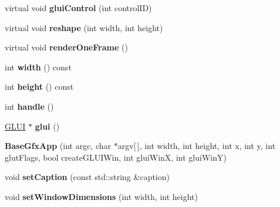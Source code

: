 \begin{DoxyCompactItemize}
\item 
\hypertarget{classBaseGfxApp_a2978a7c358794c67df73b66776b2cef3}{virtual void {\bfseries glui\-Control} (int control\-I\-D)}\label{classBaseGfxApp_a2978a7c358794c67df73b66776b2cef3}

\item 
\hypertarget{classBaseGfxApp_a5d8d5d778a8aecd7f5f8e9c87f4c3d20}{virtual void {\bfseries reshape} (int width, int height)}\label{classBaseGfxApp_a5d8d5d778a8aecd7f5f8e9c87f4c3d20}

\item 
\hypertarget{classBaseGfxApp_ad667534069c50951121968a2027b58e2}{virtual void {\bfseries render\-One\-Frame} ()}\label{classBaseGfxApp_ad667534069c50951121968a2027b58e2}

\item 
\hypertarget{classBaseGfxApp_ace089a1a94fb6bb0bc17e1b7fa48e05d}{int {\bfseries width} () const }\label{classBaseGfxApp_ace089a1a94fb6bb0bc17e1b7fa48e05d}

\item 
\hypertarget{classBaseGfxApp_aa253dbe16a20c40e0a1bf8ff942ceea3}{int {\bfseries height} () const }\label{classBaseGfxApp_aa253dbe16a20c40e0a1bf8ff942ceea3}

\item 
\hypertarget{classBaseGfxApp_ae9779f948eff6f45beec08091e98a803}{int {\bfseries handle} ()}\label{classBaseGfxApp_ae9779f948eff6f45beec08091e98a803}

\item 
\hypertarget{classBaseGfxApp_ac721a0fedce80308c5c0e5695016e95d}{\hyperlink{classGLUI}{G\-L\-U\-I} $\ast$ {\bfseries glui} ()}\label{classBaseGfxApp_ac721a0fedce80308c5c0e5695016e95d}

\item 
\hypertarget{classBaseGfxApp_a534a4b5293a35947fdae3805a103541d}{{\bfseries Base\-Gfx\-App} (int argc, char $\ast$argv\mbox{[}$\,$\mbox{]}, int width, int height, int x, int y, int glut\-Flags, bool create\-G\-L\-U\-I\-Win, int glui\-Win\-X, int glui\-Win\-Y)}\label{classBaseGfxApp_a534a4b5293a35947fdae3805a103541d}

\item 
\hypertarget{classBaseGfxApp_a4b3b1a475b7f2babaf1b477c34b15fb1}{void {\bfseries set\-Caption} (const std\-::string \&caption)}\label{classBaseGfxApp_a4b3b1a475b7f2babaf1b477c34b15fb1}

\item 
\hypertarget{classBaseGfxApp_a32fb420886f442d6be6b391a2ed3ecc1}{void {\bfseries set\-Window\-Dimensions} (int width, int height)}\label{classBaseGfxApp_a32fb420886f442d6be6b391a2ed3ecc1}


\end{DoxyCompactItemize}
